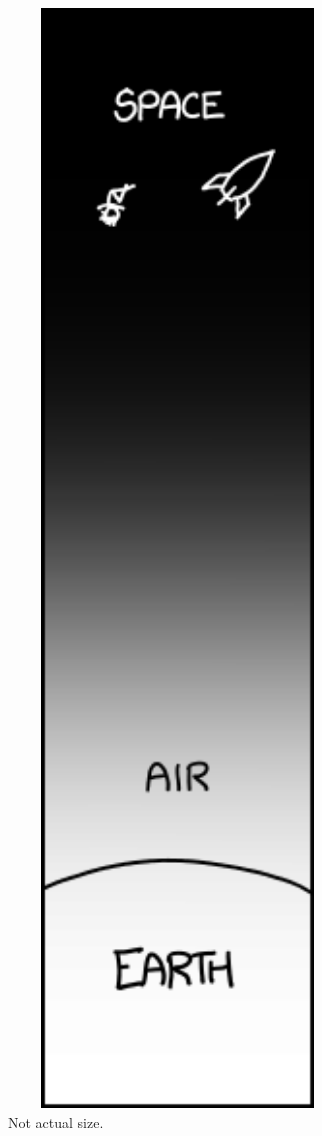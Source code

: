 {\begin{figure}[!htbp]
\centering
\includegraphics[scale=0.5, max width=0.8\textwidth]{imgs/a/58/orbit_tall.png}
\caption{Not actual size.}
\end{figure}

}
